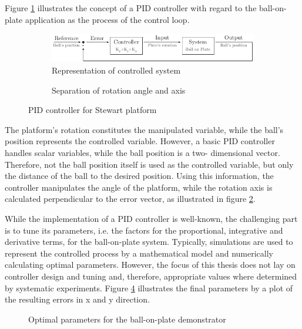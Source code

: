 Figure \ref{fig:pid_rep} illustrates the concept of a \ac{PID} controller with
regard to the ball-on-plate application as the process of the control loop.
\begin{figure}
	\centering
	\begin{subfigure}{0.49\textwidth}
		\centering
		\includegraphics{../figures/pid_rep}
		\caption{Representation of controlled system}
		\label{fig:pid_rep}
	\end{subfigure}
	\begin{subfigure}{0.49\textwidth}
		\centering
		\caption{Separation of rotation angle and axis}
		\label{fig:pid_static}
	\end{subfigure}
	\caption{\acs{PID} controller for Stewart platform}
	\label{fig:pid}
\end{figure}
The platform's rotation constitutes the manipulated variable, while the ball's
position represents the controlled variable. However, a basic \ac{PID}
controller handles scalar variables, while the ball position is a two-
dimensional vector. Therefore, not the ball position itself is used as the
controlled variable, but only the distance of the ball to the desired
position. Using this information, the controller manipulates the angle of the
platform, while the rotation axis is calculated perpendicular to the error
vector, as illustrated in figure \ref{fig:pid_static}.

While the implementation of a \ac{PID} controller is well-known, the
challenging part is to tune its parameters, i.e. the factors for the
proportional, integrative and derivative terms, for the ball-on-plate system.
Typically, simulations are used to represent the controlled process by a
mathematical model and numerically calculating optimal parameters. However,
the focus of this thesis does not lay on controller design and tuning and,
therefore, appropriate values where determined by systematic experiments.
Figure \ref{fig:pid_tuning} illustrates the final parameters by a plot of the
resulting errors in x and y direction.
\begin{figure}
	\centering
	\caption{Optimal parameters for the ball-on-plate demonstrator}
	\label{fig:pid_tuning}
\end{figure}

